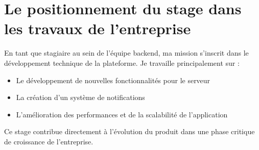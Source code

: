 \section{Le positionnement du stage dans les travaux de l'entreprise}
En tant que stagiaire au sein de l'équipe backend, ma mission s'inscrit dans le 
développement technique de la plateforme. Je travaille principalement sur :
\begin{itemize}
    \item Le développement de nouvelles fonctionnalités pour le serveur
    \item La création d'un système de notifications
    \item L'amélioration des performances et de la scalabilité de l'application
\end{itemize}

Ce stage contribue directement à l'évolution du produit dans une phase critique 
de croissance de l'entreprise.


